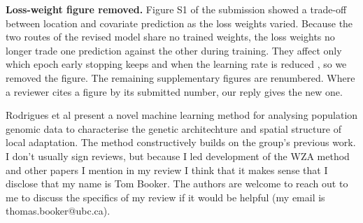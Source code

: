 \noindent
\textbf{Loss-weight figure removed.}
Figure S1 of the submission showed a trade-off between location and covariate
prediction as the loss weights varied.
Because the two routes of the revised model share no trained weights,
the loss weights no longer trade one prediction against the other during training.
They affect only which epoch early stopping keeps and when the learning rate is reduced
, so we removed the figure.
The remaining supplementary figures are renumbered.
Where a reviewer cites a figure by its submitted number, our reply gives the new one.


\begin{itquote}
Rodrigues et al present a novel machine learning method for analysing population genomic data to characterise the genetic architechture and spatial structure of local adaptation. The method constructively builds on the group's previous work. I don't usually sign reviews, but because I led development of the WZA method and other papers I mention in my review I think that it makes sense that I disclose that my name is Tom Booker. The authors are welcome to reach out to me to discuss the specifics of my review if it would be helpful (my email is thomas.booker@ubc.ca).
\end{itquote}


